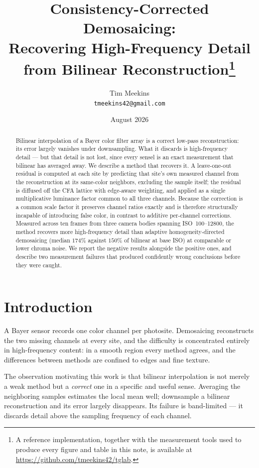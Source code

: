 \documentclass[10pt,a4paper]{article}
\title{Consistency-Corrected Demosaicing:\\
       Recovering High-Frequency Detail from Bilinear
       Reconstruction\thanks{A reference implementation, together with the
       measurement tools used to produce every figure and table in this note,
       is available at \url{https://github.com/tmeekins42/tglab}.}}
\author{Tim Meekins\\\small\texttt{tmeekins42@gmail.com}}
\date{August 2026}
\begin{document}
\maketitle

\begin{abstract}
Bilinear interpolation of a Bayer color filter array is a correct low-pass
reconstruction: its error largely vanishes under downsampling. What it discards
is high-frequency detail --- but that detail is not lost, since every sensel is
an exact measurement that bilinear has averaged away. We describe a method that
recovers it. A leave-one-out residual is computed at each site by predicting
that site's own measured channel from the reconstruction at its same-color
neighbors, excluding the sample itself; the residual is diffused off the CFA
lattice with edge-aware weighting, and applied as a single multiplicative
luminance factor common to all three channels. Because the correction is a
common scale factor it preserves channel ratios exactly and is therefore
structurally incapable of introducing false color, in contrast to additive
per-channel corrections. Measured across ten frames from three camera bodies
spanning ISO~100--12800, the method recovers more high-frequency detail than
adaptive homogeneity-directed demosaicing (median $174\%$ against $150\%$ of
bilinear at base ISO) at comparable or lower chroma noise. We report the
negative results alongside the positive ones, and describe two measurement
failures that produced confidently wrong conclusions before they were caught.
\end{abstract}

\section{Introduction}

A Bayer sensor records one color channel per photosite. Demosaicing
reconstructs the two missing channels at every site, and the difficulty is
concentrated entirely in high-frequency content: in a smooth region every method
agrees, and the differences between methods are confined to edges and fine
texture.

The observation motivating this work is that bilinear interpolation is not
merely a weak method but a \emph{correct} one in a specific and useful sense.
Averaging the neighboring samples estimates the local mean well; downsample a
bilinear reconstruction and its error largely disappears. Its failure is
band-limited --- it discards detail above the sampling frequency of each
channel.
\end{document}
